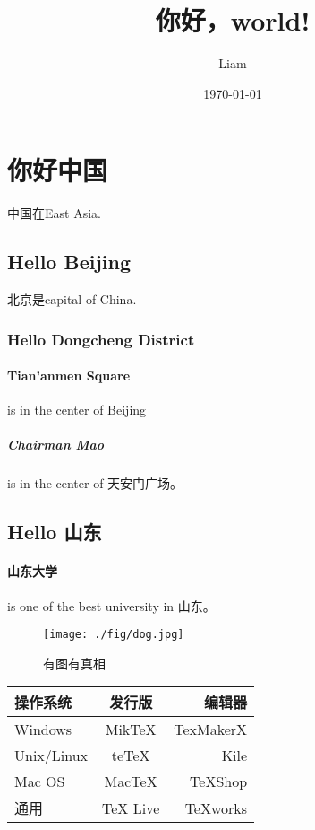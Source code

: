 \title{你好，world!}
\author{Liam}
\date{\today}
\maketitle

\newpage
\section{你好中国}
中国在East Asia.
\subsection{Hello Beijing}
北京是capital of China.
\subsubsection{Hello Dongcheng District}
\paragraph{Tian'anmen Square}
is in the center of Beijing
\subparagraph{Chairman Mao}
is in the center of 天安门广场。
\subsection{Hello 山东}
\paragraph{山东大学} is one of the best university in 山东。

\begin{figure}[htbp]
\centering
\texttt{[image: ./fig/dog.jpg]}
\caption{有图有真相}
\label{fig:myphoto}
\end{figure}

\begin{tabular}{|l|c|r|}
 \hline
操作系统& 发行版& 编辑器\\
 \hline
Windows & MikTeX & TexMakerX \\
 \hline
Unix/Linux & teTeX & Kile \\
 \hline
Mac OS & MacTeX & TeXShop \\
 \hline
通用& TeX Live & TeXworks \\
 \hline
\end{tabular}